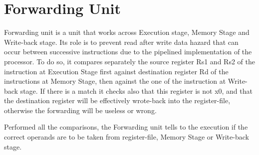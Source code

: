 \section{Forwarding Unit}

 Forwarding unit is a unit that works across Execution stage, Memory Stage and Write-back stage. Its role is to prevent read after write data hazard that can occur between successive instructions due to the pipelined implementation of the processor. To do so, it compares separately the source register Rs1 and Rs2 of the instruction at Execution Stage first against destination register Rd of the instructions at Memory Stage, then against the one of the instruction at Write-back stage. If there is a match it checks also that this register is not x0, and that the destination register will be effectively wrote-back into the register-file, otherwise the forwarding will be useless or wrong.
 
 Performed all the comparisons, the Forwarding unit tells to the execution if the correct operands are to be taken from register-file, Memory Stage or Write-back stage. 
